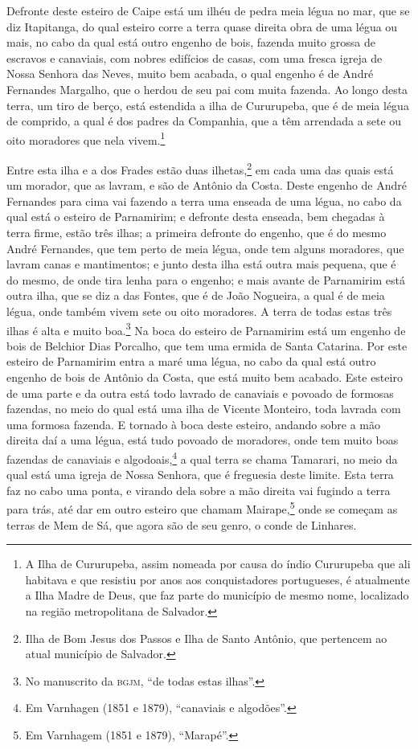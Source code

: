 Defronte deste esteiro de Caipe está um ilhéu de pedra meia légua no mar, que se diz
Itapitanga, do qual esteiro corre a terra quase direita obra de uma légua ou mais, no cabo
da qual está outro engenho de bois, fazenda muito grossa de escravos e canaviais, com
nobres edifícios de casas, com uma fresca igreja de Nossa Senhora das Neves, muito bem
acabada, o qual engenho é de André Fernandes Margalho, que o herdou de seu pai com muita
fazenda. Ao longo desta terra, um tiro de berço, está estendida a ilha de Cururupeba, que
é de meia légua de comprido, a qual é dos padres da Companhia, que a têm arrendada a sete
ou oito moradores que nela vivem.\footnote{ A Ilha de Cururupeba, assim nomeada por causa
do índio Cururupeba que ali habitava e que resistiu por anos aos conquistadores
portugueses, é atualmente a Ilha Madre de Deus, que faz parte do município de mesmo nome,
localizado na região metropolitana de Salvador.}

Entre esta ilha e a dos Frades estão duas ilhetas,\footnote{ Ilha de Bom Jesus dos Passos
e Ilha de Santo Antônio, que pertencem ao atual município de Salvador.} em cada uma das
quais está um morador, que as lavram, e são de Antônio da Costa. Deste engenho de André
Fernandes para cima vai fazendo a terra uma enseada de uma légua, no cabo da qual está o
esteiro de Parnamirim; e defronte desta enseada, bem chegadas à terra firme, estão três
ilhas; a primeira defronte do engenho, que é do mesmo André Fernandes, que tem perto de
meia légua, onde tem alguns moradores, que lavram canas e mantimentos; e junto desta ilha
está outra mais pequena, que é do mesmo, de onde tira lenha para o engenho; e mais avante
de Parnamirim está outra ilha, que se diz a das Fontes, que é de João Nogueira, a qual é
de meia légua, onde também vivem sete ou oito moradores. A terra de todas estas três ilhas
é alta e muito boa.\footnote{ No manuscrito da \textsc{bgjm}, ``de todas estas ilhas''.}
Na boca do esteiro de Parnamirim está um engenho de bois de Belchior Dias Porcalho, que
tem uma ermida de Santa Catarina. Por este esteiro de Parnamirim entra a maré uma légua,
no cabo da qual está outro engenho de bois de Antônio da Costa, que está muito bem
acabado. Este esteiro de uma parte e da outra está todo lavrado de canaviais e povoado de
formosas fazendas, no meio do qual está uma ilha de Vicente Monteiro, toda lavrada com uma
formosa fazenda. E tornado à boca deste esteiro, andando sobre a mão direita daí a uma
légua, está tudo povoado de moradores, onde tem muito boas fazendas de canaviais e
algodoais,\footnote{ Em Varnhagen (1851 e 1879), ``canaviais e algodões''.} a qual terra
se chama Tamarari, no meio da qual está uma igreja de Nossa Senhora, que é freguesia deste
limite. Esta terra faz no cabo uma ponta, e virando dela sobre a mão direita vai fugindo a
terra para trás, até dar em outro esteiro que chamam Mairape,\footnote{ Em Varnhagem (1851
e 1879), ``Marapé''.} onde se começam as terras de Mem de Sá, que agora são de seu genro,
o conde de Linhares.

